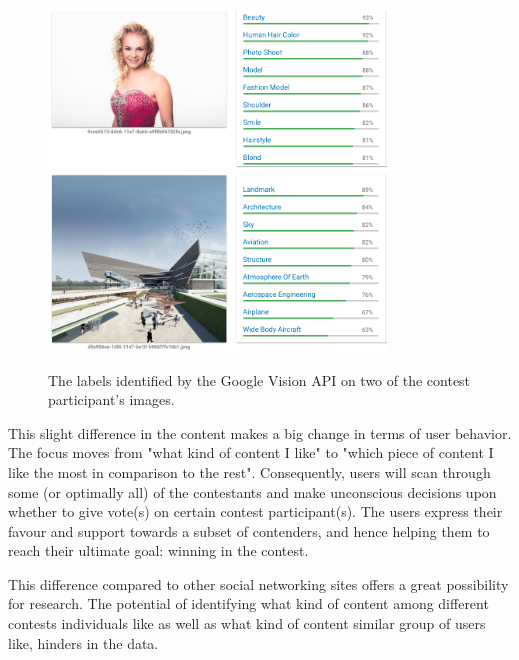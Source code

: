     \begin{figure}[h] 
		\begin{center}
            \includegraphics[width=0.8\textwidth]{images/google_vision_labels.png}
            \includegraphics[width=0.8\textwidth]{images/google_vision_labels2.png}
			\caption{The labels identified by the Google Vision API on two of the contest participant's images.}
			\label{google_vision_labels}
		\end{center}
    \end{figure}

    This slight difference in the content makes a big change in terms of user behavior. The focus moves from "what kind of content I like" to "which piece of content I like the most in comparison to the rest". Consequently, users will scan through some (or optimally all) of the contestants and make unconscious decisions upon whether to give vote(s) on certain contest participant(s). The users express their favour and support towards a subset of contenders, and hence helping them to reach their ultimate goal: winning in the contest. 

    This difference compared to other social networking sites offers a great possibility for research. The potential of identifying what kind of content among different contests individuals like as well as what kind of content similar group of users like, hinders in the data.    

